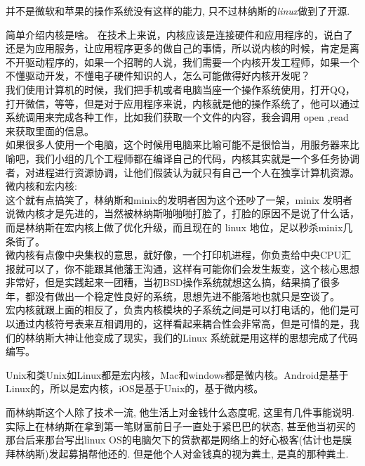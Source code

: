 \documentclass[utf8]{book}
\begin{document}
	并不是微软和苹果的操作系统没有这样的能力, 只不过林纳斯的\textit{linux}做到了开源.
	
	简单介绍内核是啥。
	在技术上来说，内核应该是连接硬件和应用程序的，说白了还是为应用服务，让应用程序更多的做自己的事情，所以说内核的时候，肯定是离不开驱动程序的，如果一个招聘的人说，我们需要一个内核开发工程师，如果一个不懂驱动开发，不懂电子硬件知识的人，怎么可能做得好内核开发呢？\\ \indent
	我们使用计算机的时候，我们把手机或者电脑当座一个操作系统使用，打开QQ，打开微信，等等，但是对于应用程序来说，内核就是他的操作系统了，他可以通过系统调用来完成各种工作，比如我们获取一个文件的内容，我会调用 open ,read 来获取里面的信息。
	\\ \indent
	如果很多人使用一个电脑，这个时候用电脑来比喻可能不是很恰当，用服务器来比喻吧，我们小组的几个工程师都在编译自己的代码，内核其实就是一个多任务协调者，对进程进行资源协调，让他们假装认为就只有自己一个人在独享计算机资源。
	\\ \indent
	微内核和宏内核:
	\\ \indent
	这个就有点搞笑了，林纳斯和minix的发明者因为这个还吵了一架，minix 发明者说微内核才是先进的，当然被林纳斯啪啪啪打脸了，打脸的原因不是说了什么话，而是林纳斯在宏内核上做了优化升级，而且现在的 linux 地位，足以秒杀minix几条街了。
	\\ \indent
	微内核有点像中央集权的意思，就好像，一个打印机进程，你负责给中央CPU汇报就可以了，你不能跟其他藩王沟通，这样有可能你们会发生叛变，这个核心思想非常好，但是实践起来一团糟，当初BSD操作系统就想这么搞，结果搞了很多年，都没有做出一个稳定性良好的系统，思想先进不能落地也就只是空谈了。
	\\ \indent
	宏内核就跟上面的相反了，负责内核模块的子系统之间是可以打电话的，他们是可以通过内核符号表来互相调用的，这样看起来耦合性会非常高，但是可惜的是，我们的林纳斯大神让他变成了现实，我们的Linux 系统就是用这样的思想完成了代码编写。
	
	Unix和类Unix如Linux都是宏内核，Mac和windows都是微内核。Android是基于Linux的，所以是宏内核，iOS是基于Unix的，基于微内核。
	
	而林纳斯这个人除了技术一流, 他生活上对金钱什么态度呢, 这里有几件事能说明. 
	实际上在林纳斯在拿到第一笔财富前日子一直处于紧巴巴的状态, 甚至他当初买的那台后来那台写出linux OS的电脑欠下的贷款都是网络上的好心极客(估计也是膜拜林纳斯)发起募捐帮他还的. 但是他个人对金钱真的视为粪土, 是真的那种粪土.
	
\end{document}
